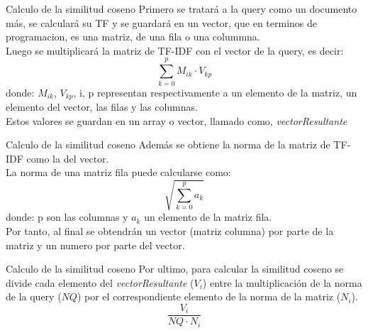 \begin{frame}{Calculo de la similitud coseno}
        Primero se tratará a la query como un documento más, se calculará su TF y se guardará
        en un vector, que en terminos de programacion, es una matriz, de una fila o una colummna.\\
        \pause \vspace*{0.3cm}
        Luego se multiplicará la matriz de TF-IDF con el vector de la query, es decir: \\
        \begin{equation}\nonumber
                \sum_{k = 0}^{p} M_{ik} \cdot V_{kp}
        \end{equation}
        donde: $M_{ik}$, $V_{kp}$, i, p representan respectivamente a un elemento de la matriz, 
        un elemento del vector, las filas y las columnas.\\
        \pause \vspace*{0.3cm}
        Estos valores se guardan en un array o vector, llamado como, \textit{vectorResultante} 
\end{frame}

\begin{frame}{Calculo de la similitud coseno}
        Además se obtiene la norma de la matriz de TF-IDF como la del vector. \\
        \pause \vspace*{0.3cm}
        La norma de una matriz fila puede calcularse como:
        \begin{equation}\nonumber
                \sqrt{\sum_{k = 0}^{p} a_k}
        \end{equation}       
        donde: p son las columnas y $a_k$ un elemento de la matriz fila. \\
        \pause \vspace*{0.3cm}
        Por tanto, al final se obtendrán un vector (matriz columna) por parte de la matriz 
        y un numero por parte del vector.
\end{frame}

\begin{frame}{Calculo de la similitud coseno}
        Por ultimo, para calcular la similitud coseno se divide cada elemento del \textit{vectorResultante} ($V_i$)
        entre la multiplicación de la norma de la query ($NQ$) por el correspondiente elemento de la norma de la matriz ($N_i$).\\

        \begin{equation}\nonumber
                \frac{V_i}{NQ \cdot N_i}
        \end{equation}
\end{frame}

